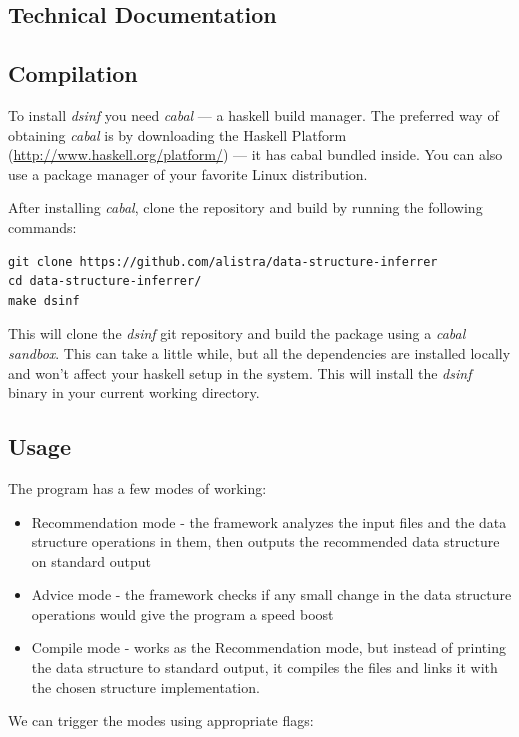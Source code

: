 \documentclass[a4paper,11pt]{article}
\begin{document}
\newpage
\begin{appendices}
\section{Technical Documentation}
	\subsection{Compilation}
	To install \emph{dsinf} you need \emph{cabal} --- a haskell build manager. The preferred way of obtaining
	\emph{cabal} is by downloading the Haskell Platform (\href{http://www.haskell.org/platform/}{http://www.haskell.org/platform/})
	--- it has cabal bundled inside. You can also use a package manager of your favorite Linux distribution.
	
	After installing \emph{cabal}, clone the repository and build by running the following commands:
	  	\begin{lstlisting}
git clone https://github.com/alistra/data-structure-inferrer
cd data-structure-inferrer/
make dsinf
		\end{lstlisting}
	This will clone the \emph{dsinf} git repository and build the package using a \emph{cabal sandbox}.
	This can take a little while, but all the dependencies are installed locally and won't affect your 
	haskell setup in the system. This will install the \emph{dsinf} binary in your current working directory.
	\subsection{Usage}

	The program has a few modes of working:
	\begin{itemize}
		\item Recommendation mode - the framework analyzes the input files and the data structure operations in
			them, then outputs the recommended data structure on standard output
		\item Advice mode - the framework checks if any small change in the data structure operations would give
			the program a speed boost
		\item Compile mode - works as the Recommendation mode, but instead of printing the data structure to
			standard output, it compiles the files and links it with the chosen structure implementation.
	\end{itemize}
	
	We can trigger the modes using appropriate flags:
	

\end{appendices}
\end{document}
